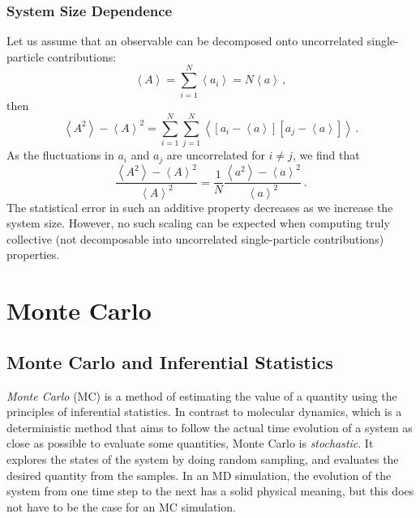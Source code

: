 \documentclass{article}
\theoremstyle{plain}\theoremheaderfont{\normalfont\itshape}\theorembodyfont{\rmfamily}\theoremseparator{.}\newtheorem*{rem}{Remark}\newtheorem*{ex}{Example}\newtheorem*{proof}{Proof}\newtheorem*{altp}{Alternative proof}
\theoremstyle{plain}\theoremheaderfont{\normalfont\bfseries}\theorembodyfont{\rmfamily}\theoremseparator{.}\newtheorem{thm}{Theorem}[section]\newtheorem{lem}[thm]{Lemma}\newtheorem{prop}[thm]{Proposition}\newtheorem*{cor}{Corollary}\newtheorem{defn}[thm]{Definition}\newtheorem{clm}[thm]{Claim}\newtheorem{clminproof}{Claim}\newtheorem{alg}[thm]{Algorithm}\newtheorem{hyp}[thm]{Hypothesis}\newtheorem{law}[thm]{Law}
\theoremstyle{break}\theoremheaderfont{\normalfont\itshape}\theorembodyfont{\rmfamily}\theoremseparator{.\medskip}\newtheorem*{proofskip}{Proof}\newtheorem*{exs}{Examples}\newtheorem*{rems}{Remarks}
\theoremstyle{break}\theoremheaderfont{\normalfont\bfseries}\theorembodyfont{\rmfamily}\theoremseparator{.\medskip}\newtheorem{lemskip}[thm]{Lemma}\newtheorem{defnskip}[thm]{Definition}\newtheorem{propskip}[thm]{Proposition}\newtheorem{thmskip}[thm]{Theorem}
\numberwithin{equation}{section}
\newcommand{\eval}[1]{\left\langle #1 \right\rangle}
\begin{document}
    \subsubsection{System Size Dependence}
    Let us assume that an observable can be decomposed onto uncorrelated single-particle contributions:
    \begin{equation}
        \eval{A}=\sum_{i=1}^{N}\eval{a_i}=N\eval{a}\,,
    \end{equation}
    then
    \begin{equation}
        \eval{A^2}-\eval{A}^2=\sum_{i=1}^{N}\sum_{j=1}^{N}\eval{[a_i-\eval{a}][a_j-\eval{a}]}\,.
    \end{equation}
    As the fluctuations in \(a_i\) and \(a_j\) are uncorrelated for \(i\ne j\), we find that
    \begin{equation}
        \frac{\eval{A^2}-\eval{A}^2}{\eval{A}^2}=\frac{1}{N}\frac{\eval{a^2}-\eval{a}^2}{\eval{a}^2}\,.
    \end{equation}
    The statistical error in such an additive property decreases as we increase the system size. However, no such scaling can be expected when computing truly collective (not decomposable into uncorrelated single-particle contributions) properties.

    \newpage
    \section{Monte Carlo}
    \subsection{Monte Carlo and Inferential Statistics}
    \textit{Monte Carlo} (MC) is a method of estimating the value of a quantity using the principles of inferential statistics. In contrast to molecular dynamics, which is a deterministic method that aims to follow the actual time evolution of a system as close as possible to evaluate some quantities, Monte Carlo is \textit{stochastic}. It explores the states of the system by doing random sampling, and evaluates the desired quantity from the samples. In an MD simulation, the evolution of the system from one time step to the next has a solid physical meaning, but this does not have to be the case for an MC simulation.
\end{document}
